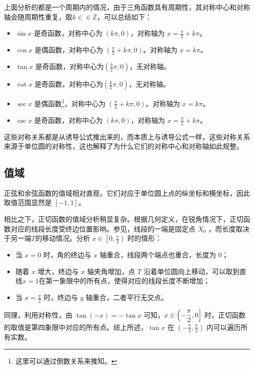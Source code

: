上面分析的都是一个周期内的情况，由于三角函数具有周期性，其对称中心和对称轴会随周期性重复，取$k\in\in\mathbb{Z}$，可以总结如下：
\begin{itemize}
\item $\sin x$ 是奇函数，对称中心为 $(k\pi,0)$，对称轴为 $x = \displaystyle\frac{\pi}{2} + k\pi$。
\item $\cos x$ 是偶函数，对称中心为 $\displaystyle \left(\frac{\pi}{2} + k\pi,0\right)$。对称轴为 $x = k\pi$。
\item $\tan x$ 是奇函数，对称中心为$\displaystyle \left(\frac{k}{2}\pi ,0\right)$，无对称轴。
\item $\cot x$ 是奇函数，对称中心为$\displaystyle \left(\frac{k}{2}\pi ,0\right)$，无对称轴。
\item $\sec x$ 是偶函数\footnote{这里可以通过倒数关系来推知。}，对称中心为 $\displaystyle \left(\frac{\pi}{2} + k\pi,0\right)$。对称轴为 $x = k\pi$。
\item $\csc x$ 是奇函数，对称中心为 $(k\pi,0)$，对称轴为 $x = \displaystyle\frac{\pi}{2} + k\pi$。
\end{itemize}

这些对称关系都是从诱导公式推出来的，而本质上与诱导公式一样，这些对称关系来源于单位圆的对称性，这也解释了为什么它们的对称中心和对称轴如此规整。

\subsection{值域}

正弦和余弦函数的值域相对直观，它们对应于单位圆上点的纵坐标和横坐标，因此取值范围显然是 $[-1,1]$。

相比之下，正切函数的值域分析稍显复杂。根据几何定义，在锐角情况下，正切函数对应的线段长度受终边位置影响。参见，线段的一端是固定点 $X_0$ ，而长度取决于另一端$T$的移动情况。分析 $\displaystyle x\in\left[0,\frac{\pi}{2}\right)$ 时的情形：
\begin{itemize}
\item 当 $x=0$ 时，角的终边与 $x$ 轴重合，线段两个端点也重合，长度为 $0$；
\item 随着 $x$ 增大，终边与 $x$ 轴夹角增加，点 $T$ 沿着单位圆向上移动，可以取到直线$x=1$在第一象限中的所有点，使得对应的线段长度不断增加；
\item 当 $\displaystyle x=\frac{\pi}{2}$ 时，终边与 $y$ 轴重合，二者平行无交点。
\end{itemize}
同理，利用对称性，由 $\tan(-x) = -\tan x$ 可知，$\displaystyle x\in\left(-{\pi\over2},0\right]$ 时，正切函数的取值是第四象限中对应的所有点。综上所述，$\tan x$ 在 $\displaystyle \left(-\frac{\pi}{2},\frac{\pi}{2}\right)$ 内可以遍历所有实数。

